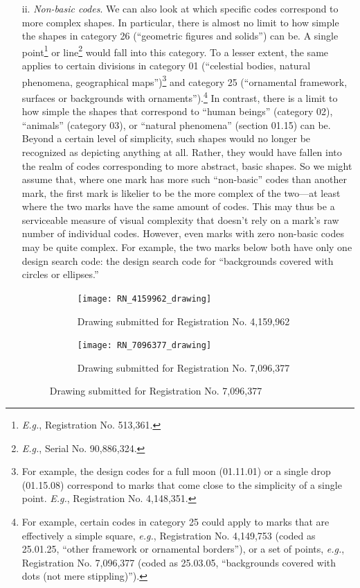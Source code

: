 \documentclass[letterpaper, 11pt, oneside]{article}
\begin{document}
\begin{enumerate}
\item[ii.] \textit{Non-basic codes}. We can also look at which specific codes correspond to more complex shapes. In particular, there is almost no limit to how simple the shapes in category 26 (``geometric figures and solids'') can be. A single point\footnote{\textit{E.g.}, Registration No. 513,361.} or line\footnote{\textit{E.g.}, Serial No. 90,886,324.} would fall into this category. To a lesser extent, the same applies to certain divisions in category 01 (``celestial bodies, natural phenomena, geographical maps'')\footnote{For example, the design codes for a full moon (01.11.01) or a single drop (01.15.08) correspond to marks that come close to the simplicity of a single point. \textit{E.g.}, Registration No. 4,148,351.} and category 25 (``ornamental framework, surfaces or backgrounds with ornaments'').\footnote{For example, certain codes in category 25 could apply to marks that are effectively a simple square, \textit{e.g.}, Registration No. 4,149,753 (coded as 25.01.25, ``other framework or ornamental borders''), or a set of points, \textit{e.g.}, Registration No. 7,096,377 (coded as 25.03.05, ``backgrounds covered with dots (not mere stippling)'').} In contrast, there is a limit to how simple the shapes that correspond to ``human beings'' (category 02), ``animals'' (category 03), or ``natural phenomena'' (section 01.15) can be. Beyond a certain level of simplicity, such shapes would no longer be recognized as depicting anything at all. Rather, they would have fallen into the realm of codes corresponding to more abstract, basic shapes. So we might assume that, where one mark has more such ``non-basic'' codes than another mark, the first mark is likelier to be the more complex of the two—at least where the two marks have the same amount of codes. This may thus be a serviceable measure of visual complexity that doesn't rely on a mark's raw number of individual codes. However, even marks with zero non-basic codes may be quite complex. For example, the two marks below both have only one design search code: the design search code for ``backgrounds covered with circles or ellipses.''

\begin{figure}[H]
\centering
\begin{subfigure}[h]{0.4\linewidth}
\texttt{[image: RN\_4159962\_drawing]} \
\caption{Drawing submitted for Registration No. 4,159,962}
\end{subfigure}
\hspace{30pt}
\begin{subfigure}[h]{0.275\linewidth}
\texttt{[image: RN\_7096377\_drawing]} \
\caption{Drawing submitted for Registration No. 7,096,377}
\end{subfigure}
\end{figure}
\par



\end{enumerate}
\end{document}
